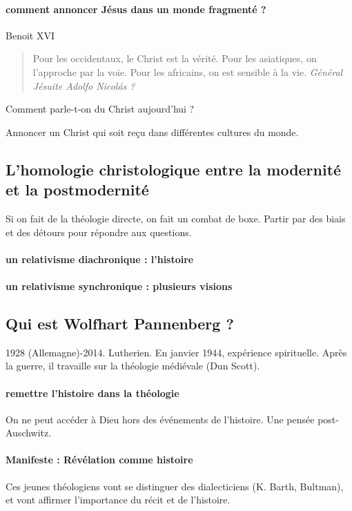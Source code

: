 \paragraph{comment annoncer Jésus dans un monde fragmenté ? } Benoit XVI
\begin{quote}
    Pour les occidentaux, le Christ est la vérité.
    Pour les asiatiques, on l'approche par la voie.
    Pour les africains, on est sensible à la vie. 
    \textit{Général Jésuite Adolfo Nicolás ?}
\end{quote}

Comment parle-t-on du Christ aujourd'hui ? 

\begin{Prop}

Annoncer un Christ qui soit reçu dans différentes cultures du monde. 
\end{Prop}
\subsection{L’homologie christologique entre la modernité et la postmodernité}

Si on fait de la théologie directe, on fait un combat de boxe. Partir par des biais et des détours pour répondre aux questions. 

\paragraph{un relativisme diachronique : l'histoire}
\paragraph{un relativisme synchronique : plusieurs visions}



\subsection{Qui est Wolfhart Pannenberg ?}
 1928 (Allemagne)-2014. Lutherien.
 En janvier 1944, expérience spirituelle. Après la guerre, il travaille sur la théologie médiévale (Dun Scott). 

 \paragraph{remettre l'histoire dans la théologie} On ne peut accéder à Dieu hors des événements de l'histoire. Une pensée post-Auschwitz. 

 \paragraph{Manifeste : Révélation comme histoire} Ces jeunes théologiens vont se distinguer des dialecticiens (K. Barth, Bultman), et vont affirmer l'importance du récit et de l'histoire. 

